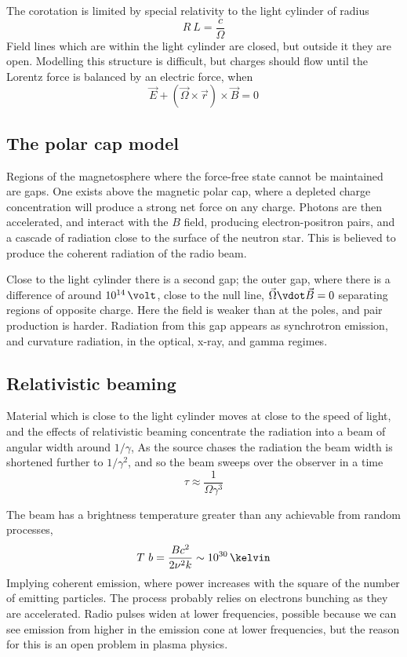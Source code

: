 The corotation is limited by special relativity to the light cylinder
of radius 
\begin{equation}
  \label{eq:123}
  R~L = \frac{c}{\Omega}
\end{equation}
Field lines which are within the light cylinder are closed, but
outside it they are open. Modelling this structure is difficult, but
charges should flow until the Lorentz force is balanced by an electric
force, when
\begin{equation}
  \label{eq:124}
  \vec{E} + (\vec{\Omega} \times \vec{r}) \times \vec{B} = 0 
\end{equation}

\subsection{The polar cap model}
\label{sec:polar-cap-model}

Regions of the magnetosphere where the force-free state cannot be
maintained are gaps. One exists above the magnetic polar cap, where a
depleted charge concentration will produce a strong net force on any
charge. Photons are then accelerated, and interact with the $B$ field,
producing electron-positron pairs, and a cascade of radiation close to
the surface of the neutron star. This is believed to produce the
coherent radiation of the radio beam.

Close to the light cylinder there is a second gap; the outer gap,
where there is a difference of around $10^{14}\,\volt$, close to the
null line, $\vec{\Omega} \vdot \vec{B} = 0$ separating regions of
opposite charge. Here the field is weaker than at the poles, and pair
production is harder. Radiation from this gap appears as synchrotron
emission, and curvature radiation, in the optical, x-ray, and gamma
regimes.

\subsection{Relativistic beaming}
\label{sec:relativistic-beaming}

Material which is close to the light cylinder moves at close to the
speed of light, and the effects of relativistic beaming concentrate
the radiation into a beam of angular width around $1/\gamma$, As the source chases the radiation the beam width is shortened further to $1/\gamma^2$, and so the beam sweeps over the observer in a time 
\begin{equation}
  \label{eq:125}
  \tau \approx \frac{1}{\Omega \gamma^3}
\end{equation}

The beam has a brightness temperature greater than any achievable from
random processes,
\[ T~b = \frac{Bc^2}{2 \nu^2 k} \sim 10^{30}\,\kelvin \] Implying
coherent emission, where power increases with the square of the number
of emitting particles.  The process probably relies on electrons
bunching as they are accelerated. Radio pulses widen at lower
frequencies, possible because we can see emission from higher in the
emission cone at lower frequencies, but the reason for this is an open
problem in plasma physics.

